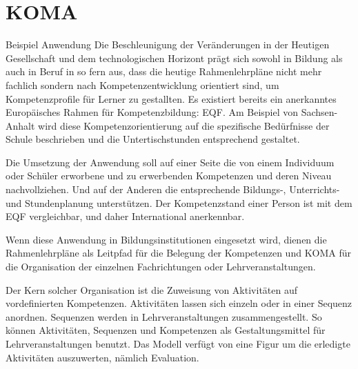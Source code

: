 \documentclass[
12pt,
english,
ngerman,
headsepline,
twoside,
openright,
numbers=noenddot,version=first
]{scrreprt}
\begin{document}
\section{KOMA}{Beispiel Anwendung}
\label{sec:KOMA}
Die Beschleunigung der Veränderungen in der Heutigen Gesellschaft und dem technologischen Horizont prägt sich sowohl in Bildung als auch in Beruf in so fern aus, dass die heutige Rahmenlehrpläne nicht mehr fachlich sondern nach Kompetenzentwicklung orientiert sind, um Kompetenzprofile für Lerner zu gestallten. Es existiert bereits ein anerkanntes Europäisches Rahmen für Kompetenzbildung: \acrfull{EQF}. Am Beispiel von Sachsen-Anhalt\cite{BildungsServerSachsen} wird diese Kompetenzorientierung auf die spezifische Bedürfnisse der Schule beschrieben und die Untertischstunden entsprechend gestaltet.

Die Umsetzung der Anwendung soll auf einer Seite die von einem Individuum oder Schüler
erworbene und zu erwerbenden Kompetenzen und deren Niveau nachvollziehen. Und auf der Anderen die entsprechende Bildungs-, Unterrichts- und Stundenplanung unterstützen.
Der Kompetenzstand einer Person ist mit dem \acrshort{EQF} vergleichbar, und daher International anerkennbar.

Wenn diese Anwendung in Bildungsinstitutionen eingesetzt wird, dienen die Rahmenlehrpläne als Leitpfad für die Belegung der Kompetenzen und \acrshort{KOMA} für die Organisation der einzelnen Fachrichtungen oder Lehrveranstaltungen. 

Der Kern solcher Organisation ist die Zuweisung von Aktivitäten auf vordefinierten Kompetenzen. Aktivitäten lassen sich einzeln oder in einer Sequenz anordnen. Sequenzen werden in Lehrveranstaltungen zusammengestellt. So können Aktivitäten, Sequenzen und Kompetenzen
als Gestaltungsmittel für Lehrveranstaltungen benutzt. Das Modell verfügt von eine Figur um die erledigte Aktivitäten auszuwerten, nämlich Evaluation.
\end{document}

